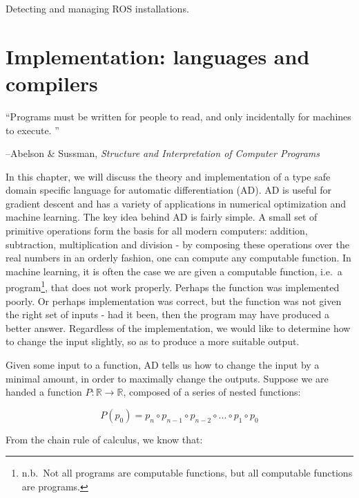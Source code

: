 \documentclass[12pt,initial,twoside,maitrise]{dms}
\numberwithin{equation}{section}
\numberwithin{table}{chapter}
\numberwithin{figure}{chapter}
\begin{document}
Detecting and managing ROS installations.

\chapter{Implementation: languages and compilers}\label{ch:kotlingrad}

\vspace{-30}

\epigraph{``Programs must be written for people to read, and only incidentally for machines to execute. ''}{\begin{flushright}--Abelson \& Sussman, \textit{Structure and Interpretation of Computer Programs}\end{flushright}}

\vspace{20}

In this chapter, we will discuss the theory and implementation of a type safe domain specific language for automatic differentiation (AD). AD is useful for gradient descent and has a variety of applications in numerical optimization and machine learning. The key idea behind AD is fairly simple. A small set of primitive operations form the basis for all modern computers: addition, subtraction, multiplication and division - by composing these operations over the real numbers in an orderly fashion, one can compute any computable function. In machine learning, it is often the case we are given a computable function, i.e.\ a program\footnote{n.b.\ Not all programs are computable functions, but all computable functions are programs.}, that does not work properly. Perhaps the function was implemented poorly. Or perhaps implementation was correct, but the function was not given the right set of inputs - had it been, then the program may have produced a better answer. Regardless of the implementation, we would like to determine how to change the input slightly, so as to produce a more suitable output.

Given some input to a function, AD tells us how to change the input by a minimal amount, in order to maximally change the outputs. Suppose we are handed a function $P: \mathbb{R}\rightarrow\mathbb{R}$, composed of a series of nested functions:

%
\begin{equation}
    P(p_0)=p_n \circ p_{n-1} \circ p_{n-2} \circ ... \circ p_1 \circ p_0
\end{equation}
%

\noindent From the chain rule of calculus, we know that:
\end{document}
